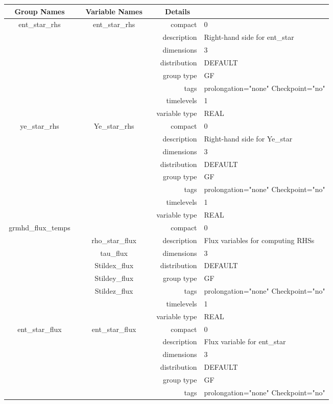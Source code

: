 \begin{tabular*}{150mm}{|c|c@{\extracolsep{\fill}}|rl|} \hline 
~ {\bf Group Names} ~ & ~ {\bf Variable Names} ~  &{\bf Details} ~ & ~ \\ 
\hline 
ent\_star\_rhs & ent\_star\_rhs & compact & 0 \\ 
 &  & description & Right-hand side for ent\_star \\ 
 &  & dimensions & 3 \\ 
 &  & distribution & DEFAULT \\ 
 &  & group type & GF \\ 
 &  & tags & prolongation="none" Checkpoint="no" \\ 
 &  & timelevels & 1 \\ 
 &  & variable type & REAL \\ 
\hline 
ye\_star\_rhs & Ye\_star\_rhs & compact & 0 \\ 
 &  & description & Right-hand side for Ye\_star \\ 
 &  & dimensions & 3 \\ 
 &  & distribution & DEFAULT \\ 
 &  & group type & GF \\ 
 &  & tags & prolongation="none" Checkpoint="no" \\ 
 &  & timelevels & 1 \\ 
 &  & variable type & REAL \\ 
\hline 
grmhd\_flux\_temps &  & compact & 0 \\ 
 & rho\_star\_flux & description & Flux variables for computing RHSs \\ 
 & tau\_flux & dimensions & 3 \\ 
 & Stildex\_flux & distribution & DEFAULT \\ 
 & Stildey\_flux & group type & GF \\ 
 & Stildez\_flux & tags & prolongation="none" Checkpoint="no" \\ 
 &  & timelevels & 1 \\ 
 &  & variable type & REAL \\ 
\hline 
ent\_star\_flux & ent\_star\_flux & compact & 0 \\ 
 &  & description & Flux variable for ent\_star \\ 
 &  & dimensions & 3 \\ 
 &  & distribution & DEFAULT \\ 
 &  & group type & GF \\ 
 &  & tags & prolongation="none" Checkpoint="no" \\ 

\end{tabular*}
